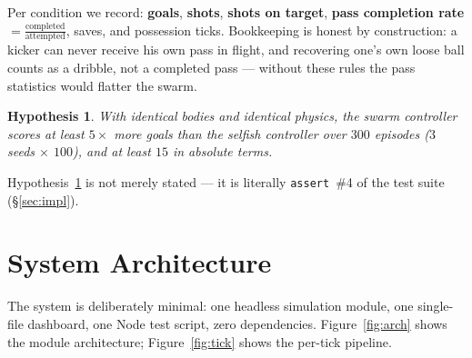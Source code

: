 \documentclass[11pt,a4paper]{article}
\newtheorem{hypothesis}{Hypothesis}
\begin{document}
Per condition we record: \textbf{goals}, \textbf{shots}, \textbf{shots on target},
\textbf{pass completion rate} $= \frac{\text{completed}}{\text{attempted}}$, saves, and
possession ticks. Bookkeeping is honest by construction: a kicker can never receive his own pass
in flight, and recovering one's own loose ball counts as a dribble, not a completed pass ---
without these rules the pass statistics would flatter the swarm.

\begin{hypothesis}\label{hyp:main}
With identical bodies and identical physics, the swarm controller scores at least $5\times$ more
goals than the selfish controller over $300$ episodes ($3$ seeds $\times$ $100$), and at least
$15$ in absolute terms.
\end{hypothesis}

Hypothesis~\ref{hyp:main} is not merely stated --- it is literally \texttt{assert}~\#4 of the
test suite (\S\ref{sec:impl}).

\section{System Architecture}\label{sec:arch}

The system is deliberately minimal: one headless simulation module, one single-file dashboard,
one Node test script, zero dependencies. Figure~\ref{fig:arch} shows the module architecture;
Figure~\ref{fig:tick} shows the per-tick pipeline.
\end{document}
